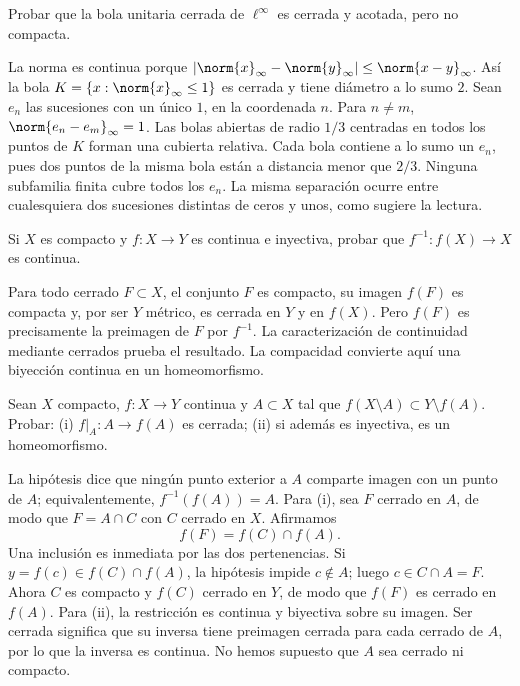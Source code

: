 \begin{ejercicio}\label{ej:lectura-13-4}
Probar que la bola unitaria cerrada de $\ell^\infty$ es cerrada y acotada, pero no compacta.
\end{ejercicio}
\begin{solucion}
La norma es continua porque $|\norm{x}_\infty-\norm{y}_\infty|\le\norm{x-y}_\infty$. Así la bola $K=\{x:\norm{x}_\infty\le1\}$ es cerrada y tiene diámetro a lo sumo $2$. Sean $e_n$ las sucesiones con un único $1$, en la coordenada $n$. Para $n\ne m$, $\norm{e_n-e_m}_\infty=1$. Las bolas abiertas de radio $1/3$ centradas en todos los puntos de $K$ forman una cubierta relativa. Cada bola contiene a lo sumo un $e_n$, pues dos puntos de la misma bola están a distancia menor que $2/3$. Ninguna subfamilia finita cubre todos los $e_n$. La misma separación ocurre entre cualesquiera dos sucesiones distintas de ceros y unos, como sugiere la lectura.
\end{solucion}

\begin{ejercicio}\label{ej:lectura-13-5}
Si $X$ es compacto y $f:X\to Y$ es continua e inyectiva, probar que $f^{-1}:f(X)\to X$ es continua.
\end{ejercicio}
\begin{solucion}
Para todo cerrado $F\subset X$, el conjunto $F$ es compacto, su imagen $f(F)$ es compacta y, por ser $Y$ métrico, es cerrada en $Y$ y en $f(X)$. Pero $f(F)$ es precisamente la preimagen de $F$ por $f^{-1}$. La caracterización de continuidad mediante cerrados prueba el resultado. La compacidad convierte aquí una biyección continua en un homeomorfismo.
\end{solucion}

\begin{ejercicio}\label{ej:lectura-13-6}
Sean $X$ compacto, $f:X\to Y$ continua y $A\subset X$ tal que $f(X\setminus A)\subset Y\setminus f(A)$. Probar: (i) $f|_A:A\to f(A)$ es cerrada; (ii) si además es inyectiva, es un homeomorfismo.
\end{ejercicio}
\begin{solucion}
La hipótesis dice que ningún punto exterior a $A$ comparte imagen con un punto de $A$; equivalentemente, $f^{-1}(f(A))=A$. Para (i), sea $F$ cerrado en $A$, de modo que $F=A\cap C$ con $C$ cerrado en $X$. Afirmamos
\[
f(F)=f(C)\cap f(A).
\]
Una inclusión es inmediata por las dos pertenencias. Si $y=f(c)\in f(C)\cap f(A)$, la hipótesis impide $c\notin A$; luego $c\in C\cap A=F$. Ahora $C$ es compacto y $f(C)$ cerrado en $Y$, de modo que $f(F)$ es cerrado en $f(A)$. Para (ii), la restricción es continua y biyectiva sobre su imagen. Ser cerrada significa que su inversa tiene preimagen cerrada para cada cerrado de $A$, por lo que la inversa es continua. No hemos supuesto que $A$ sea cerrado ni compacto.
\end{solucion}

